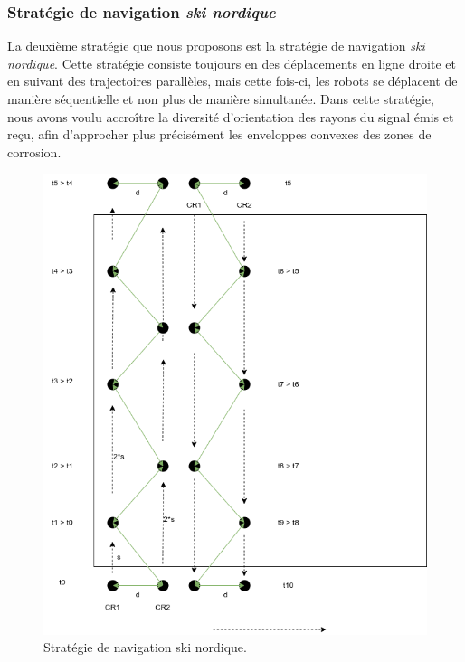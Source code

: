 \documentclass[francais,RandD]{rapportPFE}
\begin{document}
			\subsubsection*{Stratégie de navigation \textit{ski nordique}}
				La deuxième stratégie que nous proposons est la stratégie de navigation \textit{ski nordique}.
				Cette stratégie consiste toujours en des déplacements en ligne droite et en suivant des trajectoires parallèles, mais cette fois-ci, les robots se déplacent de manière séquentielle et non plus de manière simultanée.
				Dans cette stratégie, nous avons voulu accroître la diversité d'orientation des rayons du signal émis et reçu, afin d'approcher plus précisément les enveloppes convexes des zones de corrosion.

				\begin{figure}[h!]
					\centering
					\includegraphics[scale=0.5]{graphics/ski_nordique.png}
					\caption{Stratégie de navigation ski nordique.}
					\label{fig:ski_nordique1}
				\end{figure}
\end{document}
